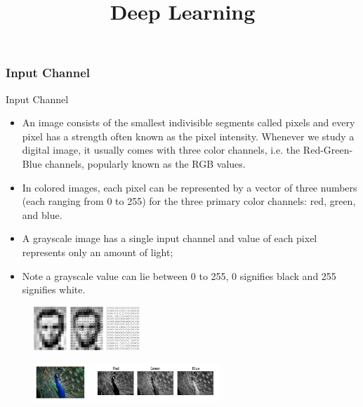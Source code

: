 




\newcommand{\titlefigure}{figure/padd.jpg}
\newcommand{\learninggoals}{
  \item Channels
}

\title{Deep Learning}
\date{}




\frametitle{Input Channel}

\begin{vbframe}{Input Channel}
    \begin{itemize}
       \item An image consists of the smallest indivisible segments called pixels and every pixel has a strength often known as the pixel intensity. Whenever we study a digital image, it usually comes with three color channels, i.e. the Red-Green-Blue channels, popularly known as the RGB values. 
       \item In colored images, each pixel can be represented by a vector of three numbers (each ranging from 0 to 255) for the three primary color channels: red, green, and blue.
       \item A grayscale image has a single input channel and value of each pixel represents only an amount of light; 
       \item Note a grayscale value can lie between 0 to 255, 0 signifies black and 255 signifies white. 
    \end{itemize}


 \begin{figure}
    \centering
    \includegraphics[width=4cm]{figure/gray.png}
  \end{figure}

 \begin{figure}
    \centering
    \includegraphics[width=7cm]{figure/RGB.jpeg}
  \end{figure}


\end{vbframe}
